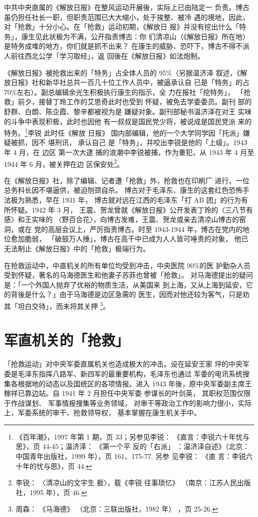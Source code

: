 中共中央直属的《解放日报》在整风运动开展後，实际上已由陆定一
负责。博古虽仍担任社长一职，但职责范围已大大缩小，处于挨整、被冷
遇的境地，因此，对「抢救」十分小心。在「抢救」运动初期，《解放日
报》并没有挖出什么「特务」，康生见此状极为不满，公开指责博古：你
们清凉山（《解放日报》所在地）
是特务成堆的地方，你们就是抓不出来？
在康生的威胁、恐吓下，博古不得不派人前往西北公学「学习取经」，返
回後在《解放日报》如法炮制。

《解放日报》被抢救出来的「特务」占全体人员的 95\%（另据温济泽 叙述，《解
放日报》社和新华社总共一百几十位工作人员中，被逼承认自 已是「特务」的占
70\%左右）。副总编辑余光生积极执行康生的指示，全 力在报社「挖特务」，
「抢救」前夕，接替丁玲工作的艾思奇此时也受到 怀疑，被免去学委委员。副刊
部的舒群、白朗、陈企霞、黎辛都被视为是 嫌疑对象。副刊部秘书温济泽在对王
实味的斗争中表现积极，此时也因他 有一叔叔是国民党少将，被说成是国民党派
来的特务。\footnote{《百年潮》，1997 年第 1 期，页 33；另参见李锐：
《直言：李锐六十年忧与思》，页 44-45；温济泽： 《第一个平 反的「右派」
：温济泽自述》（北京：中国青年出版社，1999 年），页 161、175-77. 另参
见李锐： 《直 言：李锐六十年的忧与思》，页 44. }李锐 此时任《解放 日报》
国内部编辑，他的一个大学同学因「托派」嫌疑被抓，因不 堪刑讯， 承认自己
是「特务」，并咬出李锐是他的「上级」。1943 年 4 月，在 边区 第一次大逮
捕的浪潮中李锐被捕，作为重犯，从 1943 年 4 月至 1944 年 6 月，被关押在边
区保安处\footnote{李锐： 〈清凉山的文宇生 捱〉，载《李锐 往事琐忆》
（南京：江苏人民出版社，1995 年），页 46.}。

在《解放日报》社，除了编辑、记者遭「抢救」外，抢救也在印刷厂
进行，一位总务科长因不堪逼供，被迫刎颈自杀。
博古对于毛泽东、康生的这套红色恐怖手法极为熟悉，早在 1931 年，
博古就对远在江西的毛泽东「打 AB 团」的行为有所怀疑。1942 年 3 月，
王震、贺龙曾就《解放日报》公开发表丁玲的〈三八节有感〉和王实味的
〈野百合花〉，向博古发难，王震、贺龙或亲去清凉山博古的窑洞，或在
党的高层会议上，严厉指责博古。时至 1943-1944 年，博古在党内的地
位愈加脆弱，
「破鼓万人捶」，博古在高干中已成为人人皆可唾责的对象，
他已无法制止《解放日报》中的「抢救」极端行为。

在抢救运动中，中直机关的所有单位均受到冲击，中央医院 90\%的医
护勤杂人员受到怀疑，著名的马海德医生和他妻子苏菲也曾被「抢救」。
对马海德提出的疑问是：「一个外国人抛弃了优裕的物质生活，从美国来
到上海，又从上海到延安，它的背後是什么？」由于马海德是边区急需的
医生，因而对他还较为客气，只是劝其「坦白交待」，而未将其关押
\footnote{周森：
《马海德》
（北京：三联出版社，1982 年）
，页 25-26.}。

\section{军直机关的「抢救」}
「抢救运动」对中央军委直属机关也造成极大的冲击。设在延安王家
坪的中央军委是毛泽东指挥八路军、新四军的最重要机构，毛泽东也通过
军委的电讯系统搜集各根据地的动态以及国统区的各项情报。进入 1943
年後，原中央军委副主席王稼祥已靠边站。自 1941 年 2 月担任中央军委
参谋长的叶剑英，
其职权范围仅限于作战谋划、
军事情报搜集等业务领域，
对审干等政治工作的影响力很小，实际上，军委系统的审干、抢救领导权，
基本掌握在康生机关手中。

